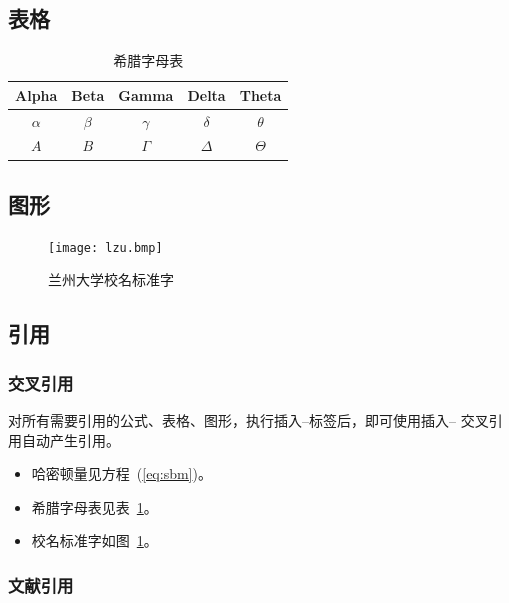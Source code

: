 \documentclass{LZUthesis}
\begin{document}
\subsection{表格}
\begin{table}[H]
\begin{centering}
\begin{tabular}{|c|c|c|c|c|}
\hline
Alpha & Beta & Gamma & Delta & Theta\\
\hline
$\alpha$ & $\beta$ & $\gamma$ & $\delta$ & $\theta$\\
\hline
$A$ & $B$ & $\Gamma$ & $\Delta$ & $\Theta$\\
\hline
\end{tabular}
\par\end{centering}
\protect\caption{希腊字母表\label{tab:Greek}}
\end{table}


\subsection{图形}


\begin{figure}[H]
\begin{centering}
\texttt{[image: lzu.bmp]}
\par\end{centering}
\protect\caption{兰州大学校名标准字\label{fig:lzu}}
\end{figure}

\subsection{引用}


\subsubsection{交叉引用}

对所有需要引用的公式、表格、图形，执行插入--标签后，即可使用插入-- 交叉引用自动产生引用。
\begin{itemize}
\item 哈密顿量见方程~(\ref{eq:sbm})。
\item 希腊字母表见表~\ref{tab:Greek}。
\item 校名标准字如图~\ref{fig:lzu}。
\end{itemize}


\subsubsection{文献引用}
\end{document}
